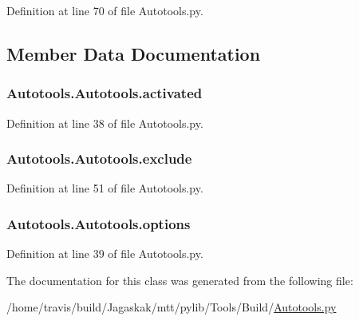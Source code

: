 Definition at line 70 of file Autotools.\-py.



\subsection{Member Data Documentation}
\hypertarget{classAutotools_1_1Autotools_a6bbb714a91bc8b6fe749326772b073b3}{
\subsubsection[{activated}]{\setlength{\rightskip}{0pt plus 5cm}Autotools.\-Autotools.\-activated}}\label{classAutotools_1_1Autotools_a6bbb714a91bc8b6fe749326772b073b3}


Definition at line 38 of file Autotools.\-py.

\hypertarget{classAutotools_1_1Autotools_aee37d9789ea22ee310ebc357cd721b7f}{
\subsubsection[{exclude}]{\setlength{\rightskip}{0pt plus 5cm}Autotools.\-Autotools.\-exclude}}\label{classAutotools_1_1Autotools_aee37d9789ea22ee310ebc357cd721b7f}


Definition at line 51 of file Autotools.\-py.

\hypertarget{classAutotools_1_1Autotools_a8b348e19f0a7104bde9c43c3a6ed695d}{
\subsubsection[{options}]{\setlength{\rightskip}{0pt plus 5cm}Autotools.\-Autotools.\-options}}\label{classAutotools_1_1Autotools_a8b348e19f0a7104bde9c43c3a6ed695d}


Definition at line 39 of file Autotools.\-py.



The documentation for this class was generated from the following file\-:\begin{DoxyCompactItemize}
\item 
/home/travis/build/\-Jagaskak/mtt/pylib/\-Tools/\-Build/\hyperlink{Autotools_8py}{Autotools.\-py}\end{DoxyCompactItemize}
